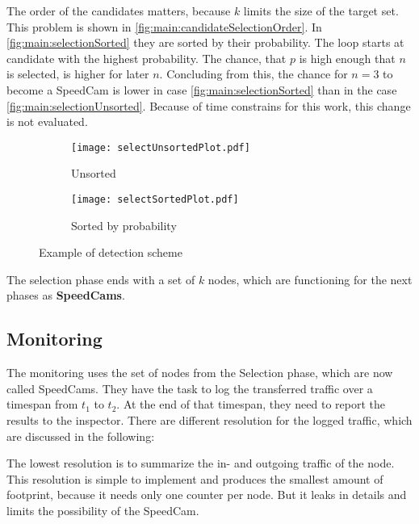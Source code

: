 \documentclass[thesis.tex]{subfiles}
\begin{document}
The order of the candidates matters, because $k$ limits the size of the target set. This problem is shown in \autoref{fig:main:candidateSelectionOrder}. In \autoref{fig:main:selectionSorted} they are sorted by their probability. The loop starts at candidate with the highest probability. The chance, that $p$ is high enough that $n$ is selected, is higher for later $n$. Concluding from this, the chance for $n=3$ to become a SpeedCam is lower in case \autoref{fig:main:selectionSorted} than in the case \autoref{fig:main:selectionUnsorted}. Because of time constrains for this work, this change is not evaluated. 
\begin{figure}[h]
    \begin{subfigure}{.45\linewidth}
        \centering
        \texttt{[image: selectUnsortedPlot.pdf]}
        \caption{Unsorted}
        \label{fig:main:selectionUnsorted}
    \end{subfigure}%
    \begin{subfigure}{0.45\linewidth}
        \centering
        \texttt{[image: selectSortedPlot.pdf]}
        \caption{Sorted by probability}
        \label{fig:main:selectionSorted}
    \end{subfigure}
    \caption{Example of detection scheme}
    \label{fig:main:candidateSelectionOrder}
\end{figure}

The selection phase ends with a set of $k$ nodes, which are functioning for the next phases as \textbf{SpeedCams}.

\subsection{Monitoring} \label{sec:main:monitoringphase}
The monitoring uses the set of nodes from the Selection phase, which are now called SpeedCams. They have the task to log the transferred traffic over a timespan from $t_1$ to $t_2$. At the end of that timespan, they need to report the results to the inspector. There are different resolution for the logged traffic, which are discussed in the following:

The lowest resolution is to summarize the in- and outgoing traffic of the node. This resolution is simple to implement and produces the smallest amount of footprint, because it needs only one counter per node. But it leaks in details and limits the possibility of the SpeedCam.
\end{document}
